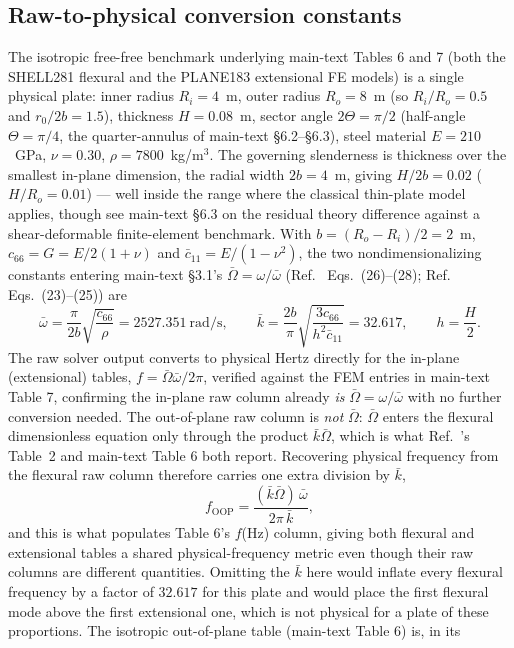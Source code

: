 \documentclass[11pt]{article}
\begin{document}
\subsection{Raw-to-physical conversion constants}\label{sec:conversion-sm}
The isotropic free-free benchmark underlying main-text Tables 6 and 7
(both the SHELL281 flexural and the PLANE183 extensional FE models) is a
single physical plate: inner radius $R_i=4$~m, outer radius $R_o=8$~m
(so $R_i/R_o=0.5$ and $r_0/2b=1.5$), thickness $H=0.08$~m, sector angle
$2\Theta=\pi/2$ (half-angle $\Theta=\pi/4$, the quarter-annulus of
main-text \S6.2--\S6.3), steel material $E=210$~GPa, $\nu=0.30$,
$\rho=7800$~kg/m$^3$. The governing slenderness is thickness over the
smallest in-plane dimension, the radial width $2b=4$~m, giving $H/2b=0.02$
($H/R_o=0.01$) --- well inside the range where the classical thin-plate
model applies, though see main-text \S6.3 on the residual theory difference
against a shear-deformable finite-element benchmark. With $b=(R_o-R_i)/2=2$~m, $c_{66}=G=E/2(1+\nu)$ and
$\bar c_{11}=E/(1-\nu^2)$, the two nondimensionalizing constants
entering main-text \S3.1's $\bar\Omega=\omega/\bar\omega$
(Ref.~\cite{seok1} Eqs.~(26)--(28); Ref.~\cite{seok2} Eqs.~(23)--(25))
are
\[
\bar\omega=\frac{\pi}{2b}\sqrt{\frac{c_{66}}{\rho}}=2527.351\ \mathrm{rad/s},
\qquad
\bar k=\frac{2b}{\pi}\sqrt{\frac{3c_{66}}{h^{2}\bar c_{11}}}=32.617,
\qquad h=\frac{H}{2}.
\]
The raw solver output converts to physical Hertz directly for the
in-plane (extensional) tables, $f=\bar\Omega\bar\omega/2\pi$, verified
against the FEM entries in main-text Table 7, confirming the in-plane
raw column already \emph{is} $\bar\Omega=\omega/\bar\omega$ with no
further conversion needed. The out-of-plane raw column is \emph{not}
$\bar\Omega$: $\bar\Omega$ enters the flexural dimensionless equation
only through the product $\bar k\bar\Omega$, which is what
Ref.~\cite{seok1}'s Table~2 and main-text Table 6 both report.
Recovering physical frequency from the flexural raw column therefore
carries one extra division by $\bar k$,
\[
f_{\mathrm{OOP}}=\frac{(\bar k\bar\Omega)\,\bar\omega}{2\pi\,\bar k},
\]
and this is what populates Table 6's $f$(Hz) column, giving both
flexural and extensional tables a shared physical-frequency metric even
though their raw columns are different quantities. Omitting the $\bar k$
here would inflate every flexural frequency by a factor of $32.617$ for
this plate and would place the first flexural mode above the first
extensional one, which is not physical for a plate of these proportions.
The isotropic out-of-plane table (main-text Table 6) is, in its
\end{document}
